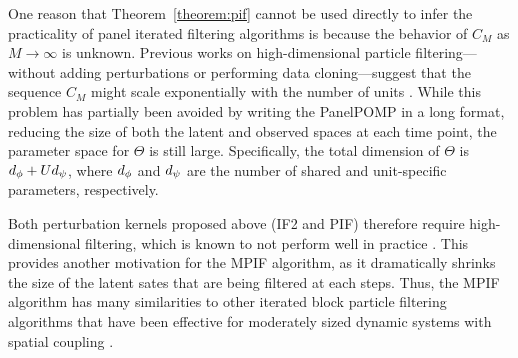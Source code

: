 One reason that Theorem~\ref{theorem:pif} cannot be used directly to infer the practicality of panel iterated filtering algorithms is because the behavior of $C_M$ as $M \rightarrow \infty$ is unknown.
Previous works on high-dimensional particle filtering---without adding perturbations or performing data cloning---suggest that the sequence $C_M$ might scale exponentially with the number of units \citep{snyder08,bengtsson08}.
While this problem has partially been avoided by writing the PanelPOMP in a long format, reducing the size of both the latent and observed spaces at each time point, the parameter space for $\Theta$ is still large.
Specifically, the total dimension of $\Theta$ is $d_\phi + Ud_\psi$, where $d_\phi$ and $d_\psi$ are the number of shared and unit-specific parameters, respectively.

Both perturbation kernels proposed above (IF2 and PIF) therefore require high-dimensional filtering, which is known to not perform well in practice \citep{rebeschini15}.
This provides another motivation for the MPIF algorithm, as it dramatically shrinks the size of the latent sates that are being filtered at each steps. 
Thus, the MPIF algorithm has many similarities to other iterated block particle filtering algorithms that have been effective for moderately sized dynamic systems with spatial coupling \citep{ning23,ionides24}.
